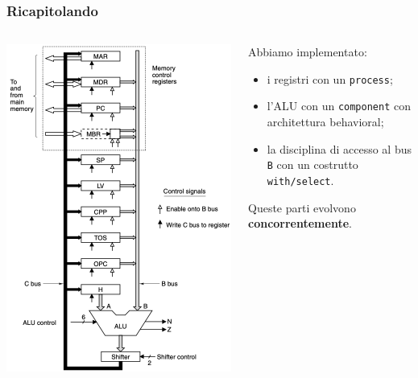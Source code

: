 \documentclass{beamer}
\begin{document}
\begin{frame}
  \frametitle{Ricapitolando}
  \begin{columns}
    \begin{column}{0.4\textwidth}
      \begin{center}
        \includegraphics[width=\textwidth]{datapath.png}
      \end{center}
    \end{column}
    \begin{column}{0.6\textwidth}
  Abbiamo implementato:
  \begin{itemize}
    \item i registri con un \lstinline{process};
    \item l'ALU con un \lstinline{component} con architettura behavioral;
    \item la disciplina di accesso al bus \lstinline{B} con un costrutto
    \lstinline{with/select}.
  \end{itemize}
  Queste parti evolvono \textbf{concorrentemente}.
\end{column}
\end{columns}
\end{frame}
\end{document}

